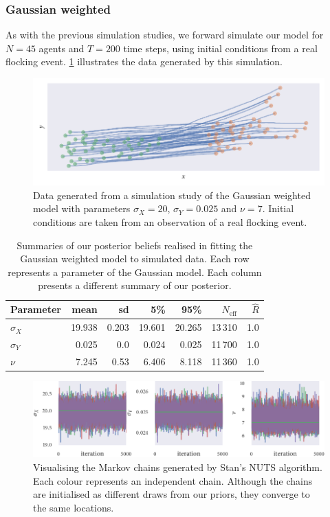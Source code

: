 \subsubsection{Gaussian weighted}

As with the previous simulation studies, we forward simulate our model for $N=45$ agents
and $T=200$ time steps, using initial conditions from a real flocking event.
\cref{fig:gauss_sim_study} illustrates the data generated by this simulation.

\begin{figure}[tbp]
  \includegraphics{gauss_sim.pdf}
  \caption{Data generated from a simulation study of the Gaussian weighted model with
  parameters $\sigma_X=20$, $\sigma_Y=0.025$ and $\nu=7$. Initial conditions are taken
  from an observation of a real flocking event.}
  \label{fig:gauss_sim_study}
\end{figure}
\begin{table}[tbp]
  \begin{tabular}{@{}lrrrrrr@{}}
    \toprule
    Parameter    & mean   & sd    & 5\%     & 95\%     & $N_{\textrm{eff}}$ & $\hat{R}$ \\
    \midrule
    $\sigma_{X}$ & 19.938 & 0.203 & 19.601  & 20.265   & 13\,310            & 1.0       \\
    $\sigma_{Y}$ & 0.025  & 0.0   & 0.024   & 0.025    & 11\,700            & 1.0       \\
    $\nu$        & 7.245  & 0.53  & 6.406   & 8.118    & 11\,360            & 1.0       \\
    \bottomrule
  \end{tabular}
  \caption{Summaries of our posterior beliefs realised in fitting the Gaussian weighted
  model to simulated data. Each row represents a parameter of the Gaussian model. Each
  column presents a different summary of our posterior.}
  \label{tab:gauss_sim_study_summary}
\end{table}
\begin{figure}[tbp]
  \includegraphics{stan_gauss_trace.pdf}
  \caption{Visualising the Markov chains generated by Stan's NUTS algorithm. Each colour
  represents an independent chain. Although the chains are initialised as different draws
  from our priors, they converge to the same locations.}
  \label{fig:gauss_sim_study_chains}
\end{figure}
